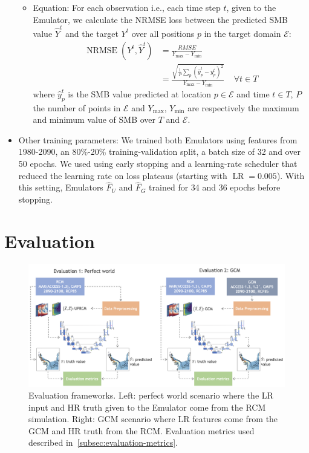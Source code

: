 \documentclass[a4paper,11pt,oneside]{report}
\begin{document}
\begin{itemize}
\begin{itemize}
        \item Equation: For each observation i.e., each time step $t$, given to the Emulator, we calculate the NRMSE loss between the predicted SMB value $\hat{Y}^{t}$ and the target $Y^{t}$ over all positions $p$ in the target domain $\mathcal{E}$:
        \begin{align}
        \operatorname{NRMSE}\left(Y^{t},\hat{Y}^{t}\right) &= \frac{RMSE}{Y_{\max} - Y_{\min}} \\
         &=\frac{\sqrt{\frac{1}{P}\sum_{p}(\hat{y}_{p}^{t}-y^{t}_{p})^2}}{Y_{\max} - Y_{\min}}   \;\;\;\; \forall t \in T
        \end{align}
        where $\hat{y}_{p}^{t}$ is the SMB value predicted at location $p\in \mathcal{E}$ and time $t \in T$, $P$ the number of points in $\mathcal{E}$ and $Y_{\max}$, $Y_{\min}$ are respectively the maximum and minimum value of SMB over $T$ and $\mathcal{E}$.
    \end{itemize}
    \item Other training parameters: We trained both Emulators using features from 1980-2090, an 80\%-20\% training-validation split, a batch size of 32 and over 50 epochs. We used using early stopping and a learning-rate scheduler that reduced the learning rate on loss plateaus (starting with $\operatorname{LR} = 0.005$). With this setting, Emulators $\hat{F}_U$ and $\hat{F}_G$ trained for 34 and 36 epochs before stopping. 
\end{itemize}

\section{Evaluation}\label{sec:evaluation}

\begin{figure}[!t]
  \centering
  \includegraphics[width=\columnwidth]{images/evaluation_framework.png}
  \caption []{\small Evaluation frameworks. Left: perfect world scenario where the LR input and HR truth given to the Emulator come from the RCM simulation. Right: GCM scenario where LR features come from the GCM and HR truth from the RCM. Evaluation metrics used described in~\ref{subsec:evaluation-metrics}.}
  \vspace{-3mm}
  \label{fig:evaluation-framework}
\end{figure}
\end{document}
